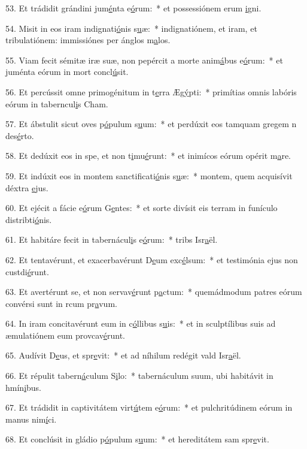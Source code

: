 53. Et trádidit grándini jum\uline{é}nta e\uline{ó}rum:~* et possessiónem erum \uline{i}gni.\par 
54. Misit in eos iram indignati\uline{ó}nis s\uline{u}æ:~* indignatiónem, et iram, et tribulatiónem: immissiónes per ánglos m\uline{a}los.\par 
55. Viam fecit sémitæ iræ suæ, non pepércit a morte anim\uline{á}bus e\uline{ó}rum:~* et juménta eórum in mort concl\uline{ú}sit.\par 
56. Et percússit omne primogénitum in t\uline{e}rra Æg\uline{ý}pti:~* primítias omnis labóris eórum in taberncul\uline{i}s Cham.\par 
57. Et ábstulit sicut oves p\uline{ó}pulum s\uline{u}um:~* et perdúxit eos tamquam gregem n des\uline{é}rto.\par 
58. Et dedúxit eos in spe, et non t\uline{i}mu\uline{é}runt:~* et inimícos eórum opérit m\uline{a}re.\par 
59. Et indúxit eos in montem sanctificati\uline{ó}nis s\uline{u}æ:~* montem, quem acquisívit déxtra \uline{e}jus.\par 
60. Et ejécit a fácie e\uline{ó}rum G\uline{e}ntes:~* et sorte divísit eis terram in funículo distribti\uline{ó}nis.\par 
61. Et habitáre fecit in tabernácul\uline{i}s e\uline{ó}rum:~* tribs Isr\uline{a}ël.\par 
62. Et tentavérunt, et exacerbavérunt D\uline{e}um exc\uline{é}lsum:~* et testimónia ejus non custdi\uline{é}runt.\par 
63. Et avertérunt se, et non servav\uline{é}runt p\uline{a}ctum:~* quemádmodum patres eórum convérsi sunt in rcum pr\uline{a}vum.\par 
64. In iram concitavérunt eum in c\uline{ó}llibus s\uline{u}is:~* et in sculptílibus suis ad æmulatiónem eum provcav\uline{é}runt.\par 
65. Audívit D\uline{e}us, et spr\uline{e}vit:~* et ad níhilum redégit vald Isr\uline{a}ël.\par 
66. Et répulit tabern\uline{á}culum S\uline{i}lo:~* tabernáculum suum, ubi habitávit in hmín\uline{i}bus.\par 
67. Et trádidit in captivitátem virt\uline{ú}tem e\uline{ó}rum:~* et pulchritúdinem eórum in manus nim\uline{í}ci.\par 
68. Et conclúsit in gládio p\uline{ó}pulum s\uline{u}um:~* et hereditátem sam spr\uline{e}vit.\par 
